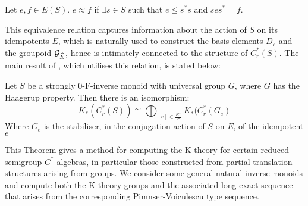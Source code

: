 \begin{definition}
Let $e,f \in E(S)$. $e \approx f$ if $\exists s \in S$ such that $e \leq s^{*}s$ and $ses^{*}=f$.
\end{definition}

This equivalence relation captures information about the action of $S$ on its idempotents $E$, which is naturally used to construct the basis elements $D_{e}$ and the groupoid $\mathcal{G}_{\widehat{E}}$, hence is intimately connected to the structure of $C^{*}_{r}(S)$. The main result of \cite{Nor-2012}, which utilises this relation, is stated below:

\begin{theorem}\label{Thm:Norling}
Let $S$ be a strongly 0-F-inverse monoid with universal group $G$, where $G$ has the Haagerup property. Then there is an isomorphism:
\begin{equation*}
K_{*}(C^{*}_{r}(S)) \cong \bigoplus_{[e]\in \frac{E^{\times}}{\approx}} K_{*}(C^{*}_{r}(G_{e})
\end{equation*}
Where $G_{e}$ is the stabiliser, in the conjugation action of $S$ on $E$, of the idempotent $e$
\end{theorem}

This Theorem gives a method for computing the K-theory for certain reduced semigroup $C^{*}$-algebras, in particular those constructed from partial translation structures arising from groups. We consider some general natural inverse monoids and compute both the K-theory groups and the associated long exact sequence that arises from the corresponding Pimnser-Voiculescu type sequence.

